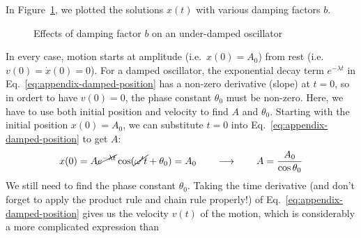 In Figure~\ref{fig:damping-effects-appendix}, we plotted the solutions $x(t)$
with various damping factors $b$.
\begin{figure}[ht]
  \centering
  \caption{Effects of damping factor $b$ on an under-damped oscillator}
  \label{fig:damping-effects-appendix}
\end{figure}
In every case, motion starts at amplitude (i.e.\ $x(0)=A_0$) from rest (i.e.\
$v(0)=\dot x(0)=0$). For a damped oscillator, the exponential decay term
$e^{-\lambda t}$ in Eq.~\ref{eq:appendix-damped-position} has a non-zero
derivative (slope) at $t=0$, so in ordert to have $v(0)=0$, the phase constant
$\theta_0$ must be non-zero. Here, we have to use both initial position and
velocity to find $A$ and $\theta_0$. Starting with the initial position
$x(0)=A_0$, we can substitute $t=0$ into Eq.~\ref{eq:appendix-damped-position}
to get $A$:
\begin{equation}
  x(0)= A\cancel{e^{-\lambda t}}\cos(\cancel{\omega't}+\theta_0)=A_0
  \quad\quad\longrightarrow\quad\quad
  A=\frac{A_0}{\cos\theta_0}
\end{equation}
We still need to find the phase constant $\theta_0$. Taking the time
derivative (and don't forget to apply the product rule and chain rule
properly!) of Eq.~\ref{eq:appendix-damped-position} gives us the velocity
$v(t)$ of the motion, which is considerably a more complicated expression than
